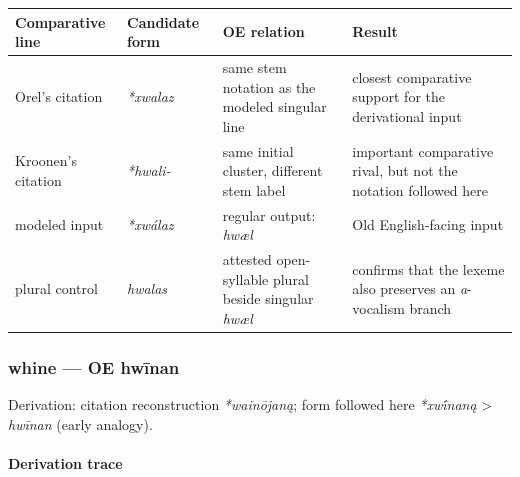 \documentclass[
  british,
  a4paper,
]{article}
\newcounter{none} %
\begin{document}
{\def\LTcaptype{none} %
\begin{longtable}[]{@{}
  >{\raggedright\arraybackslash}p{}
  >{\raggedright\arraybackslash}p{}
  >{\raggedright\arraybackslash}p{}
  >{\raggedright\arraybackslash}p{}@{}}
\toprule\noalign{}
\begin{minipage}[b]{\linewidth}\raggedright
Comparative line
\end{minipage} & \begin{minipage}[b]{\linewidth}\raggedright
Candidate form
\end{minipage} & \begin{minipage}[b]{\linewidth}\raggedright
OE relation
\end{minipage} & \begin{minipage}[b]{\linewidth}\raggedright
Result
\end{minipage} \\
\midrule\noalign{}
\endhead
\bottomrule\noalign{}
\endlastfoot
Orel's citation & \emph{*xwalaz} & same stem notation as the modeled
singular line & closest comparative support for the derivational
input \\
Kroonen's citation & \emph{*hwali-} & same initial cluster, different
stem label & important comparative rival, but not the notation followed
here \\
modeled input & \emph{*xwálaz} & regular output: \emph{hwæl} & Old
English-facing input \\
plural control & \emph{hwalas} & attested open-syllable plural beside
singular \emph{hwæl} & confirms that the lexeme also preserves an
\emph{a}-vocalism branch \\
\end{longtable}
}

\subsubsection{whine --- OE hwīnan}\label{whine-oe-hwux12bnan}

Derivation: citation reconstruction \emph{*wainōjaną}; form followed
here \emph{*xwī́naną} \textgreater{} \emph{hwīnan} (early analogy).

\paragraph{Derivation trace}\label{derivation-trace-35}
\end{document}
